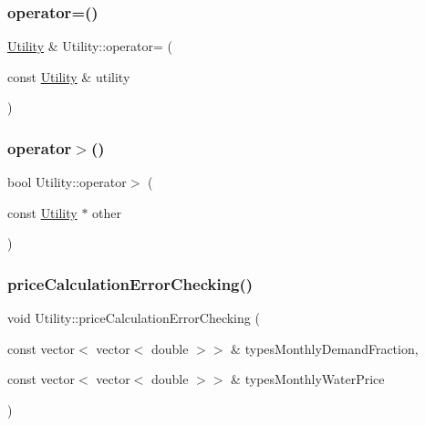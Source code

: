 \mbox{\label{classUtility_a9bf6f9126779f4035fccbd35333de575}} 
\subsubsection{\texorpdfstring{operator=()}{operator=()}}
{\footnotesize\ttfamily \mbox{\hyperlink{classUtility}{Utility}} \& Utility\+::operator= (\begin{DoxyParamCaption}\item[{const \mbox{\hyperlink{classUtility}{Utility}} \&}]{utility }\end{DoxyParamCaption})}

\mbox{\label{classUtility_a222897e8c338fde0d754df4683fbc89b}} 
\subsubsection{\texorpdfstring{operator$>$()}{operator>()}}
{\footnotesize\ttfamily bool Utility\+::operator$>$ (\begin{DoxyParamCaption}\item[{const \mbox{\hyperlink{classUtility}{Utility}} $\ast$}]{other }\end{DoxyParamCaption})}

\mbox{\label{classUtility_a01ec91140b9d23bf5b03e0fc55bced0d}} 
\subsubsection{\texorpdfstring{price\+Calculation\+Error\+Checking()}{priceCalculationErrorChecking()}}
{\footnotesize\ttfamily void Utility\+::price\+Calculation\+Error\+Checking (\begin{DoxyParamCaption}\item[{const vector$<$ vector$<$ double $>$$>$ \&}]{types\+Monthly\+Demand\+Fraction,  }\item[{const vector$<$ vector$<$ double $>$$>$ \&}]{types\+Monthly\+Water\+Price }\end{DoxyParamCaption})}

